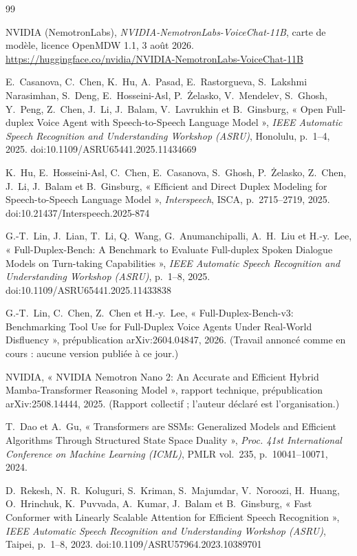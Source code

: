 \documentclass[11pt,a4paper]{article}
\begin{document}
\begin{thebibliography}{99}\small

 NVIDIA (NemotronLabs),
\emph{NVIDIA-NemotronLabs-VoiceChat-11B}, carte de modèle, licence
OpenMDW 1.1, 3 août 2026.
\url{https://huggingface.co/nvidia/NVIDIA-NemotronLabs-VoiceChat-11B}

 E.~Casanova, C.~Chen, K.~Hu, A.~Pasad,
E.~Rastorgueva, S.~Lakshmi Narasimhan, S.~Deng, E.~Hosseini-Asl, P.~Żelasko,
V.~Mendelev, S.~Ghosh, Y.~Peng, Z.~Chen, J.~Li, J.~Balam, V.~Lavrukhin et
B.~Ginsburg, « Open Full-duplex Voice Agent with Speech-to-Speech Language
Model », \emph{IEEE Automatic Speech Recognition and Understanding Workshop
(ASRU)}, Honolulu, p.~1--4, 2025. doi:10.1109/ASRU65441.2025.11434669

 K.~Hu, E.~Hosseini-Asl, C.~Chen, E.~Casanova, S.~Ghosh,
P.~Żelasko, Z.~Chen, J.~Li, J.~Balam et B.~Ginsburg, « Efficient and Direct
Duplex Modeling for Speech-to-Speech Language Model », \emph{Interspeech},
ISCA, p.~2715--2719, 2025. doi:10.21437/Interspeech.2025-874

 G.-T.~Lin, J.~Lian, T.~Li, Q.~Wang,
G.~Anumanchipalli, A.~H.~Liu et H.-y.~Lee, « Full-Duplex-Bench: A Benchmark to
Evaluate Full-duplex Spoken Dialogue Models on Turn-taking Capabilities »,
\emph{IEEE Automatic Speech Recognition and Understanding Workshop (ASRU)},
p.~1--8, 2025. doi:10.1109/ASRU65441.2025.11433838

 G.-T.~Lin, C.~Chen, Z.~Chen et H.-y.~Lee,
« Full-Duplex-Bench-v3: Benchmarking Tool Use for Full-Duplex Voice Agents
Under Real-World Disfluency », prépublication arXiv:2604.04847, 2026.
(Travail annoncé comme en cours : aucune version publiée à ce jour.)

 NVIDIA, « NVIDIA Nemotron Nano 2: An Accurate and
Efficient Hybrid Mamba-Transformer Reasoning Model », rapport technique,
prépublication arXiv:2508.14444, 2025. (Rapport collectif ; l'auteur déclaré
est l'organisation.)

 T.~Dao et A.~Gu, « Transformers are SSMs: Generalized Models
and Efficient Algorithms Through Structured State Space Duality »,
\emph{Proc. 41st International Conference on Machine Learning (ICML)}, PMLR
vol.~235, p.~10041--10071, 2024.

 D.~Rekesh, N.~R.~Koluguri, S.~Kriman, S.~Majumdar,
V.~Noroozi, H.~Huang, O.~Hrinchuk, K.~Puvvada, A.~Kumar, J.~Balam et
B.~Ginsburg, « Fast Conformer with Linearly Scalable Attention for Efficient
Speech Recognition », \emph{IEEE Automatic Speech Recognition and
Understanding Workshop (ASRU)}, Taipei, p.~1--8, 2023.
doi:10.1109/ASRU57964.2023.10389701


\end{thebibliography}
\end{document}
